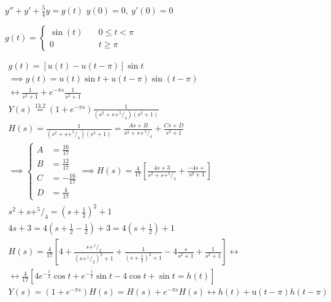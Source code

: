 \documentclass[11pt,a4paper,titlepage,final]{article}
\begin{document}
\begin{exercise*}{13.3}
	\( y''+y'+\frac{5}{4}y=g(t) \)
	\( y(0) = 0,\ y'(0) = 0 \)
	
	\( g(t) = \begin{cases}
	\sin (t) \quad& 0 \leq t < \pi \\
	0 & t \geq \pi
	\end{cases} \)
	
	\tcblower
	
	\begin{gather*}
	g(t) = \left[u(t)-u(t-\pi)\right]\sin t \\
	\implies g(t) = u(t)\sin t +u(t-\pi)\sin(t-\pi)\\
	\leftrightarrow \frac{1}{s^2+1}+e^{-\pi s}\frac{1}{s^2+1}
	\\
	Y(s) \overset{\text{13.2}}{=}\left(1+e^{-\pi s}\right)\frac{1}{(s^2+s+^5/_4)\left(s^2+1\right)}
	\\
	H(s) = \frac{1}{(s^2+s+^5/_4)\left(s^2+1\right)} = \frac{As+B}{s^2+s+^5/_4} + \frac{Cs+D}{s^2+1}
	\\
	\implies \begin{cases}
	A &= \frac{16}{17} \\
	B &= \frac{12}{17} \\
	C &= - \frac{16}{17} \\
	D &= \frac{4}{17}
	\end{cases} \implies H(s) = \frac{4}{17} \left[
	\frac{4s+3}{s^2+s+^5/_4}+ \frac{-4s+}{s^2+1}
	\right]
	\\
	s^2+s+^5/_4 = \left(s+\frac{1}{2}\right)^2 + 1 \\
	4s+3 = 4\left(s+\frac{1}{2}-\frac{1}{2}\right)+3 = 4\left(s+\frac{1}{2}\right)+1
	\\
	H(s) = \frac{4}{17} \left[
	4+\frac{s+^1/_2}{\left(s+^1/_2\right)^2+1}+\frac{1}{\left(s+\frac{1}{2}\right)^2+1}-4\frac{s}{s^2+1}+\frac{1}{s^2+1}
	\right] \leftrightarrow \\
	\leftrightarrow \frac{4}{17} \left[
	4e^{-\frac{t}{2}}\cos t + e^{-\frac{t}{2}}\sin t - 4\cos t +\sin t =h(t)
	\right] \\
	Y(s) = 
	\left(1+e^{-\pi s}\right)H(s) = H(s) + e^{-\pi s}H(s) \leftrightarrow h(t) + \mathrm u(t-\pi)h(t-\pi)
	\end{gather*}
\end{exercise*}
\end{document}
